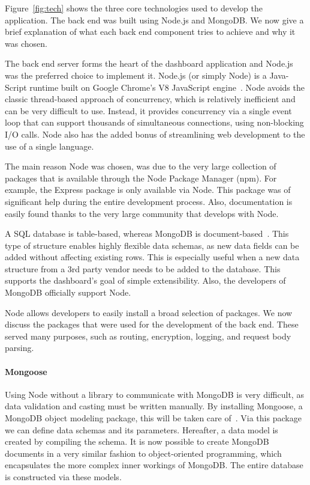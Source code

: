         Figure~\ref{fig:tech} shows the three core technologies used to develop the application. The back end was built using Node.js and MongoDB\@. We now give a brief explanation of what each back end component tries to achieve and why it was chosen.


            The back end server forms the heart of the dashboard application and Node.js was the preferred choice to implement it. Node.js (or simply Node) is a Java-Script runtime built on Google Chrome's V8 JavaScript engine~\cite{NodeJS}. Node avoids the classic thread-based approach of concurrency, which is relatively inefficient and can be very difficult to use. Instead, it provides concurrency via a single event loop that can support thousands of simultaneous connections, using non-blocking I/O calls. Node also has the added bonus of streamlining web development to the use of a single language.
            
            The main reason Node was chosen, was due to the very large collection of packages that is available through the Node Package Manager (npm). For example, the Express package is only available via Node. This package was of significant help during the entire development process. Also, documentation is easily found thanks to the very large community that develops with Node.

            
            A SQL database is table-based, whereas MongoDB is document-based~\cite{MongoDB}. This type of structure enables highly flexible data schemas, as new data fields can be added without affecting existing rows. This is especially useful when a new data structure from a 3rd party vendor needs to be added to the database. This supports the dashboard's goal of simple extensibility. Also, the developers of MongoDB officially support Node.


            Node allows developers to easily install a broad selection of packages. We now discuss the packages that were used for the development of the back end. These served many purposes, such as routing, encryption, logging, and request body parsing. 

            \paragraph{Mongoose} Using Node without a library to communicate with MongoDB is very difficult, as data validation and casting must be written manually. By installing Mongoose, a MongoDB object modeling package, this will be taken care of~\cite{Mongoose}. Via this package we can define data schemas and its parameters. Hereafter, a data model is created by compiling the schema. It is now possible to create MongoDB documents in a very similar fashion to object-oriented programming, which encapsulates the more complex inner workings of MongoDB\@. The entire database is constructed via these models.

